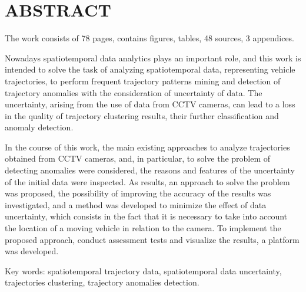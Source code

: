 \chapter*{ABSTRACT}

The work consists of 78 pages, contains  figures,  tables, 48 sources, 3 appendices.

Nowadays spatiotemporal data analytics plays an important role, and this work is intended to solve the task of analyzing spatiotemporal data, representing vehicle trajectories, to perform frequent trajectory patterns mining and detection of trajectory anomalies with the consideration of uncertainty of data. The uncertainty, arising from the use of data from CCTV cameras, can lead to a loss in the quality of trajectory clustering results, their further classification and anomaly detection.

In the course of this work, the main existing approaches to analyze trajectories obtained from CCTV cameras, and, in particular, to solve the problem of detecting anomalies were considered, the reasons and features of the uncertainty of the initial data were inspected. As results, an approach to solve the problem was proposed, the possibility of improving the accuracy of the results was investigated, and a method was developed to minimize the effect of data uncertainty, which consists in the fact that it is necessary to take into account the location of a moving vehicle in relation to the camera. To implement the proposed approach, conduct assessment tests and visualize the results, a platform was developed.

Key words: spatiotemporal trajectory data, spatiotemporal data uncertainty, trajectories clustering, trajectory anomalies detection.